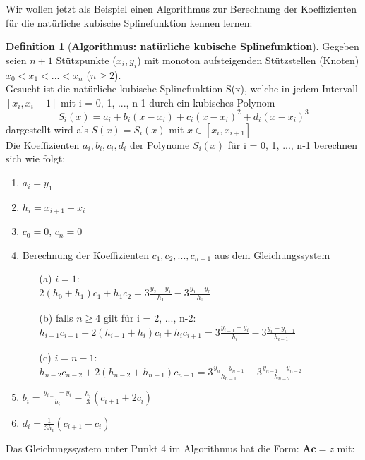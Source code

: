 \documentclass{article}
\newenvironment{Figure}
	{\par\medskip\noindent\minipage{\linewidth}}
	{\endminipage\par\medskip}
\theoremstyle{satz}
\theoremstyle{definition}
\newtheorem{definition}{Definition}
\begin{document}
Wir wollen jetzt als Beispiel einen Algorithmus zur Berechnung der Koeffizienten für die natürliche kubische Splinefunktion kennen lernen:

\theoremstyle{definition}
\begin{tcolorbox}
\begin{definition}[\textbf{Algorithmus: natürliche kubische Splinefunktion}]
Gegeben seien $n+1$ Stützpunkte ($x_i,y_i$) mit monoton aufsteigenden Stützstellen (Knoten) $x_0 < x_1 < ... < x_n$ ($n\geq 2$).\\
Gesucht ist die natürliche kubische Splinefunktion S(x), welche in jedem Intervall $[x_i, x_i+1]$ mit i = 0, 1, ..., n-1 durch ein kubisches Polynom
\begin{equation}
S_i(x) = a_i + b_i(x-x_i)+c_i(x-x_i)^2+d_i(x-x_i)^3
\end{equation}
dargestellt wird als $S(x) = S_i(x)$ mit $x \in [x_i, x_{i+1}]$\\
Die Koeffizienten $a_i, b_i, c_i, d_i$ der Polynome $S_i(x)$ für i = 0, 1, ..., n-1 berechnen sich wie folgt:
\begin{enumerate}
	\item $a_i = y_1$
	\item $h_i = x_{i+1} - x_i$
	\item $c_0 = 0$, $c_n = 0$
	\item {Berechnung der Koeffizienten $c_1, c_2, ..., c_{n-1}$ aus dem Gleichungssystem
	\begin{itemize}
		\item[(a)] { $i=1$:\\
		$2(h_0 + h_1) c_1 + h_1c_2 = 3 \frac{y_2-y_1}{h_1} - 3\frac{y_1-y_0}{h_0}$}
		\item[(b)] {falls $n \geq 4$ gilt für i = 2, ..., n-2:\\
		$h_{i-1}c_{i-1}+2(h_{i-1}+h_i)c_i+h_ic_{i+1} = 3 \frac{y_{i+1} - y_i}{h_i}- 3 \frac{y_i - y_{i-1}}{h_{i-1}}$}
		\item[(c)] {$i = n-1$:\\
		$h_{n-2}c_{n-2} + 2(h_{n-2}+h_{n-1})c_{n-1} = 3\frac{y_n-y_{n-1}}{h_{n-1}} - 3 \frac{y_{n-1} - y_{n-2}}{h_{n-2}}$
		}
	\end{itemize}
	}	
	\item $b_i = \frac{y_{i+1} - y_i}{h_i} - \frac{h_i}{3} (c_{i+1} + 2c_i)$
	\item $d_i = \frac{1}{3h_i}(c_{i+1} - c_i)$
\end{enumerate}
Das Gleichungssystem unter Punkt 4 im Algorithmus hat die Form: $\textbf{Ac} = z$ mit:
\begin{Figure}

\end{Figure}
\end{definition}
\end{tcolorbox}
\end{document}
